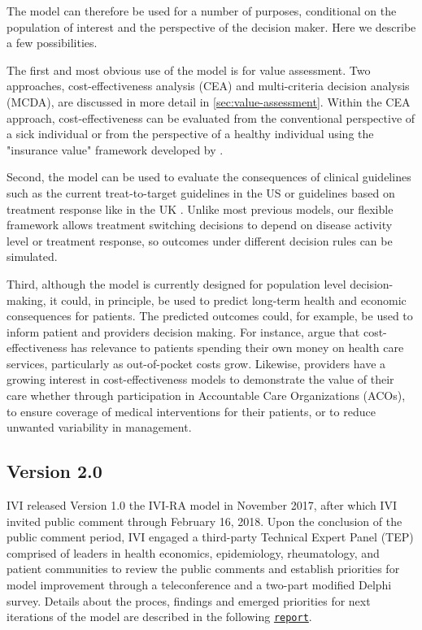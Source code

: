 \documentclass[11pt,final,fleqn]{article}
\theoremstyle{plain}
\newcommand{\code}[1]{\texttt{#1}}
\begin{document}
The model can therefore be used for a number of purposes, conditional on the population of interest and the perspective of the decision maker. Here we describe a few possibilities. 

The first and most obvious use of the model is for value assessment. Two approaches, cost-effectiveness analysis (CEA) and multi-criteria decision analysis (MCDA), are discussed in more detail in \autoref{sec:value-assessment}. Within the CEA approach, cost-effectiveness can be evaluated from the conventional perspective of a sick individual or from the perspective of a healthy individual using the "insurance value" framework developed by \citet{lakdawalla2017insurance}. 

Second, the model can be used to evaluate the consequences of clinical guidelines such as the current treat-to-target guidelines in the US \citep{singh20162015} or guidelines based on treatment response like in the UK \citep{deighton2010bsr}. Unlike most previous models, our flexible framework allows treatment switching decisions to depend on disease activity level or treatment response, so outcomes under different decision rules can be simulated.   

Third, although the model is currently designed for population level decision-making, it could, in principle, be used to predict long-term health and economic consequences for patients. The predicted outcomes could, for example, be used to inform patient and providers decision making. For instance, \citet{ioannidis2011individualized} argue that cost-effectiveness has relevance to patients spending their own money on health care services, particularly as out-of-pocket costs grow. Likewise, providers have a growing interest in cost-effectiveness models to demonstrate the value of their care whether through participation in Accountable Care Organizations (ACOs), to ensure coverage of medical interventions for their patients, or to reduce unwanted variability in management. 

\subsection{Version 2.0}\label{sec:version-history}
IVI released Version 1.0 the IVI-RA model in November 2017, after which IVI invited public comment through February 16, 2018. Upon the conclusion of the public comment period, IVI engaged a third-party Technical Expert Panel (TEP) comprised of leaders in health economics, epidemiology, rheumatology, and patient communities to review the public comments and establish priorities for model improvement through a teleconference and a two-part modified Delphi survey. Details about the proces, findings and emerged priorities for next iterations of the model are described in the following \code{\href{https://www.thevalueinitiative.org/wp-content/uploads/2018/09/OSVP-IVI-RA-Model-v1.0-Process-Summary_FINAL.pdf}{report}}. 
\end{document}
